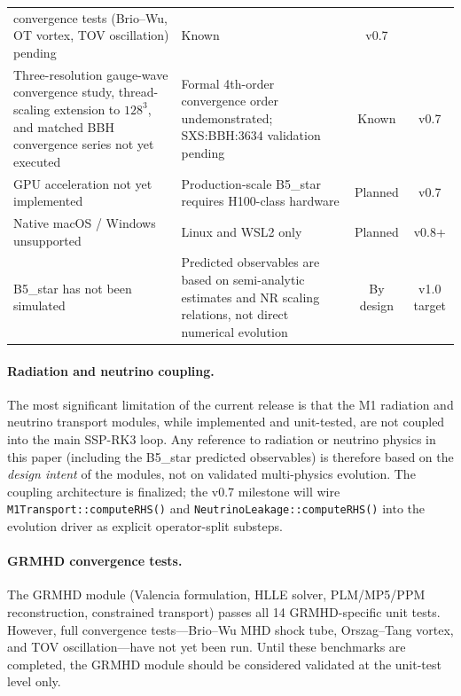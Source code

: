 \documentclass[aps,prd,twocolumn,superscriptaddress,nofootinbib,showpacs,
               longbibliography]{revtex4-2}
\newcommand{\code}[1]{\texttt{#1}}
\begin{document}
\begin{table}[t]
\begin{ruledtabular}
\begin{tabular}{p{6cm}p{4.5cm}cc}
      convergence tests (Brio--Wu, OT vortex, TOV oscillation) pending
    & Known & v0.7 \\[2pt]
    Three-resolution gauge-wave convergence study, thread-scaling extension
    to $128^3$, and matched BBH convergence series not yet executed
    & Formal 4th-order convergence order undemonstrated;
      SXS:BBH:3634 validation pending
    & Known & v0.7 \\[2pt]
  GPU acceleration not yet implemented
    & Production-scale B5\_star requires H100-class hardware
    & Planned & v0.7 \\[2pt]
  Native macOS / Windows unsupported
    & Linux and WSL2 only
    & Planned & v0.8+ \\[2pt]
  B5\_star has not been simulated
    & Predicted observables are based on semi-analytic estimates
      and NR scaling relations, not direct numerical evolution
    & By design & v1.0 target \\
\end{tabular}
\end{ruledtabular}
\end{table}

\paragraph{Radiation and neutrino coupling.}
The most significant limitation of the current release is that the M1
radiation and neutrino transport modules, while implemented and unit-tested,
are not coupled into the main SSP-RK3 loop.
Any reference to radiation or neutrino physics in this paper (including the
B5\_star predicted observables) is therefore based on the \emph{design intent}
of the modules, not on validated multi-physics evolution.
The coupling architecture is finalized; the v0.7 milestone will wire
\code{M1Transport::computeRHS()} and \code{NeutrinoLeakage::computeRHS()}
into the evolution driver as explicit operator-split substeps.

\paragraph{GRMHD convergence tests.}
The GRMHD module (Valencia formulation, HLLE solver, PLM/MP5/PPM
reconstruction, constrained transport) passes all 14 GRMHD-specific unit
tests.
However, full convergence tests---Brio--Wu MHD shock tube, Orszag--Tang
vortex, and TOV oscillation---have not yet been run.
Until these benchmarks are completed, the GRMHD module should be considered
validated at the unit-test level only.
\end{document}
